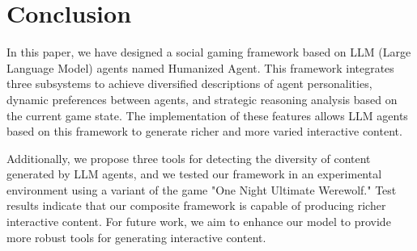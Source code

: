 \section{Conclusion}

In this paper, we have designed a social gaming framework based on LLM (Large Language Model) agents named Humanized Agent. This framework integrates three subsystems to achieve diversified descriptions of agent personalities, dynamic preferences between agents, and strategic reasoning analysis based on the current game state. The implementation of these features allows LLM agents based on this framework to generate richer and more varied interactive content.

Additionally, we propose three tools for detecting the diversity of content generated by LLM agents, and we tested our framework in an experimental environment using a variant of the game "One Night Ultimate Werewolf." Test results indicate that our composite framework is capable of producing richer interactive content. For future work, we aim to enhance our model to provide more robust tools for generating interactive content.
